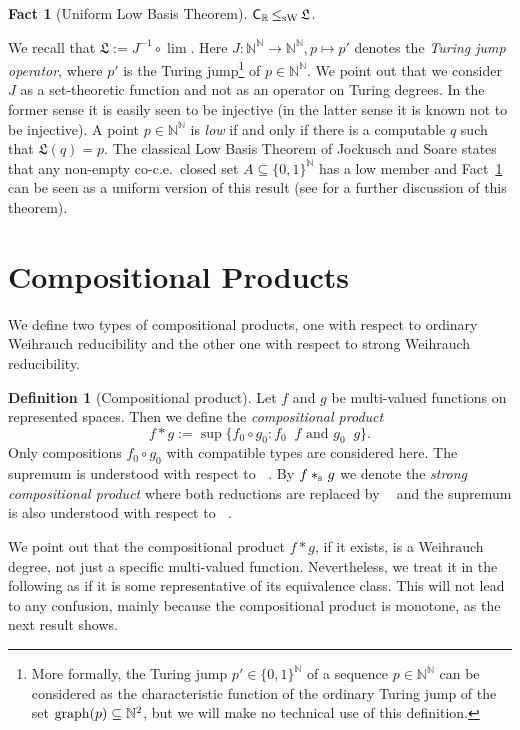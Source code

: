 \documentclass[a4paper]{amsart}
\def\IN{{\mathbb{N}}}
\def\IR{{\mathbb{R}}}
\def\Low{\mathfrak{L}}
\def\In{\subseteq}
\def\graph{{\rm graph}}
\def\Cantor{{\{0,1\}^\IN}}
\def\Baire{{\IN^\IN}}
\def\C{\mbox{\rm\sffamily C}}
\def\leqW{\mathop{\leq_{\mathrm{W}}}}
\def\leqSW{\mathop{\leq_{\mathrm{sW}}}}
\def\stars{*_{\rm s}\;\!}
\newtheorem{fact}[theorem]{Fact}
\theoremstyle{definition}
\newtheorem{definition}[theorem]{Definition}
\begin{document}
\begin{fact}[Uniform Low Basis Theorem] 
\label{fact:low-basis}
$\C_\IR\leqSW\Low$.
\end{fact}

We recall that $\Low:=J^{-1}\circ\lim$. 
Here $J:\Baire\to\Baire,p\mapsto p'$ denotes the {\em Turing jump operator}, where
$p'$ is the Turing jump\footnote{More formally, the Turing jump $p'\in\{0,1\}^\IN$ of a sequence $p\in\IN^\IN$
can be considered as the characteristic function of the ordinary Turing jump of the set $\graph(p)\In\IN^2$, but
we will make no technical use of this definition.} of $p\in\IN^\IN$.  
We point out that we consider $J$ as a set-theoretic function and not as an 
operator on Turing degrees. In the former sense it is easily seen to be injective
(in the latter sense it is known not to be injective). 
A point $p\in\Baire$ is {\em low} if and only if there is a computable $q$ such that $\Low(q)=p$.
The classical Low Basis Theorem of Jockusch and Soare \cite{JS72} states that any non-empty co-c.e.\ closed set $A\In\Cantor$ has a 
low member and Fact~\ref{fact:low-basis} can be seen as a uniform version of this result (see \cite{BBP} for a further discussion of this theorem).


\section{Compositional Products}

We define two types of compositional products, one with respect to ordinary Weihrauch
reducibility and the other one with respect to strong Weihrauch reducibility.

\begin{definition}[Compositional product]
Let $f$ and $g$ be multi-valued functions on represented spaces.
Then we define the {\em compositional product} 
\[f*g:=\sup\{f_0\circ g_0:f_0\leqW f\mbox{ and }g_0\leqW g\}.\]
Only compositions $f_0\circ g_0$ with compatible types are considered here.
The supremum is understood with respect to $\leqW$.
By $f\stars g$ we denote the {\em strong compositional product}
where both reductions are replaced by $\leqSW$ and the supremum is also
understood with respect to $\leqSW$.
\end{definition}

We point out that the compositional product $f*g$, if it exists, is 
a Weihrauch degree, not just a specific multi-valued function. 
Nevertheless, we treat it in the following as if it is some representative
of its equivalence class. This will not lead to any confusion, mainly
because the compositional product is monotone, as the next 
result shows.
\end{document}
